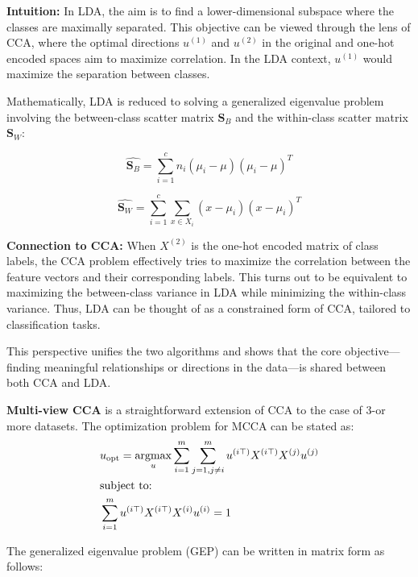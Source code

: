 \textbf{Intuition:} In LDA, the aim is to find a lower-dimensional subspace where the classes are maximally separated. This objective can be viewed through the lens of CCA, where the optimal directions \(u^{(1)}\) and \(u^{(2)}\) in the original and one-hot encoded spaces aim to maximize correlation. In the LDA context, \(u^{(1)}\) would maximize the separation between classes.

Mathematically, LDA is reduced to solving a generalized eigenvalue problem involving the between-class scatter matrix \(\mathbf{S}_B\) and the within-class scatter matrix \(\mathbf{S}_W\):

\[
    \hat{\mathbf{S}_B} = \sum_{i=1}^{c} n_i (\mu_i - \mu)(\mu_i - \mu)^T
\]

\[
    \hat{\mathbf{S}_W} = \sum_{i=1}^{c} \sum_{x \in X_i} (x - \mu_i)(x - \mu_i)^T
\]

\textbf{Connection to CCA:} When \(X^{(2)}\) is the one-hot encoded matrix of class labels, the CCA problem effectively tries to maximize the correlation between the feature vectors and their corresponding labels. This turns out to be equivalent to maximizing the between-class variance in LDA while minimizing the within-class variance. Thus, LDA can be thought of as a constrained form of CCA, tailored to classification tasks.

This perspective unifies the two algorithms and shows that the core objective—finding meaningful relationships or directions in the data—is shared between both CCA and LDA.

\textbf{Multi-view CCA} is a straightforward extension of CCA to the case of 3-or more datasets.
The optimization problem for MCCA can be stated as:
\begin{align}
     & u_{\text{opt}} = \underset{u}{\mathrm{argmax}} \sum_{i=1}^{m} \sum_{j=1, j \neq i}^{m} u^{(i\top)} X^{(i\top)} X^{(j)} u^{(j)} \\
     & \text{subject to:} \notag \\
     & \sum_{i=1}^{m} u^{(i\top)} X^{(i\top)} X^{(i)} u^{(i)} = 1 \notag
\end{align}

The generalized eigenvalue problem (GEP) can be written in matrix form as follows:

